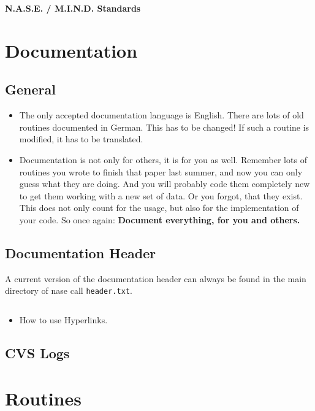 \documentclass[12pt]{article}
\begin{document}
{\Huge\textbf{N.A.S.E. / M.I.N.D. Standards}}

\section{Documentation}
\subsection{General}
\begin{itemize}
\item The only accepted documentation language is English. There are lots of old routines documented in German. This has to be changed! If such a routine is modified, it has to be translated. 
\item Documentation is not only for others, it is for you as well. Remember lots of routines you wrote to finish that paper last summer, and now you can only guess what they are doing. And you will probably code them completely new to get them working with a new set of data. Or you forgot, that they exist. This does not only count for the usage, but also for the implementation of your code. So once again: \textbf{Document everything, for you and others.}
\end{itemize}

\subsection{Documentation Header}
A current version of the documentation header can always be found in the main directory of nase call \texttt{header.txt}.
\begin{verbatim}

\end{verbatim}

\begin{itemize}
\item How to use Hyperlinks.
\end{itemize}

\subsection{CVS Logs}





\section{Routines}
\end{document}
